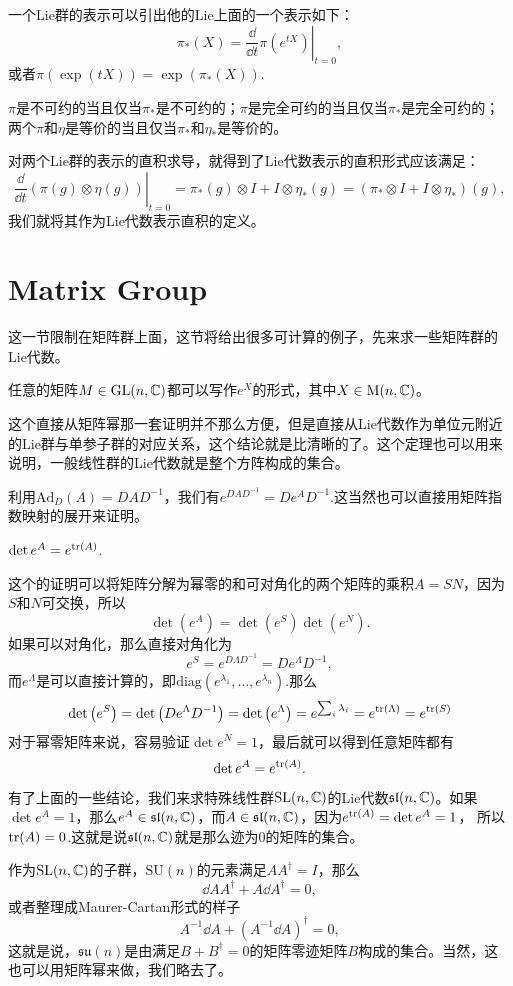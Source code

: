 一个Lie群的表示可以引出他的Lie上面的一个表示如下：
\[
	\pi_*(X)=\left.\frac{\dd}{\dd t}\pi(e^{tX})\right|_{t=0},
\]
或者$\pi(\exp(tX))=\exp(\pi_*(X))$.

\pro $\pi$是不可约的当且仅当$\pi_*$是不可约的；$\pi$是完全可约的当且仅当$\pi_*$是完全可约的；两个$\pi$和$\eta$是等价的当且仅当$\pi_*$和$\eta_*$是等价的。

对两个Lie群的表示的直积求导，就得到了Lie代数表示的直积形式应该满足：
\[
	\left.\frac{\dd}{\dd t}(\pi(g)\otimes \eta(g))\right|_{t=0}=\pi_*(g)\otimes I+I\otimes \eta_*(g)=(\pi_*\otimes I+I\otimes \eta_*)(g),
\]
我们就将其作为Lie代数表示直积的定义。

\section{Matrix Group}
这一节限制在矩阵群上面，这节将给出很多可计算的例子，先来求一些矩阵群的Lie代数。

\theo 任意的矩阵$M\in\mathrm{GL}(n,\mathbb{C})$都可以写作$e^X$的形式，其中$X\in\mathrm{M}(n,\mathbb{C})$。

这个直接从矩阵幂那一套证明并不那么方便，但是直接从Lie代数作为单位元附近的Lie群与单参子群的对应关系，这个结论就是比清晰的了。这个定理也可以用来说明，一般线性群的Lie代数就是整个方阵构成的集合。

\para 利用$\mathrm{Ad}_D(A)=DAD^{-1}$，我们有$e^{DAD^{-1}}=De^{A}D^{-1}$.这当然也可以直接用矩阵指数映射的展开来证明。

\pro $\det e^A=e^{\operatorname{tr}(A)}$.

这个的证明可以将矩阵分解为幂零的和可对角化的两个矩阵的乘积$A=SN$，因为$S$和$N$可交换，所以
\[
	\det \left(e^A\right)=\det\left(e^S\right)\det\left(e^N\right).
\]
如果可以对角化，那么直接对角化为
\[
	e^{S}=e^{D\Lambda D^{-1}}=De^{\Lambda} D^{-1},
\]
而$e^{\Lambda}$是可以直接计算的，即$\mathrm{diag}\left(e^{\lambda_1},\dots,e^{\lambda_n}\right)$.那么
\[
	\det \left(e^{S}\right)=\det \left(De^{\Lambda} D^{-1}\right)=\det \left(e^{\Lambda}\right)=e^{\sum_i \lambda_i}=e^{\operatorname{tr}(\Lambda)}=e^{\operatorname{tr}(S)}
\]
对于幂零矩阵来说，容易验证$\det e^N=1$，最后就可以得到任意矩阵都有
\[
	\det e^A=e^{\operatorname{tr}(A)}.
\]

有了上面的一些结论，我们来求特殊线性群$\mathrm{SL}(n,\mathbb{C})$的Lie代数$\mathfrak{sl}(n,\mathbb{C})$。如果$\det e^A=1$，那么$e^A\in \mathfrak{sl}(n,\mathbb{C})$，而$A \in \mathfrak{sl}(n,\mathbb{C})$，因为$e^{\operatorname{tr}(A)}=\det e^A=1$，
所以$\operatorname{tr}(A)=0$.这就是说$\mathfrak{sl}(n,\mathbb{C})$就是那么迹为0的矩阵的集合。

作为$\mathrm{SL}(n,\mathbb{C})$的子群，$\mathrm{SU}(n)$的元素满足$AA^\dag=I$，那么
\[
	\dd A A^\dag+A\dd A^\dag=0,
\]
或者整理成Maurer-Cartan形式的样子
\[
	A^{-1}\dd A +(A^{-1}\dd A)^\dag=0,
\]
这就是说，$\mathfrak{su}(n)$是由满足$B+B^\dag=0$的矩阵零迹矩阵$B$构成的集合。当然，这也可以用矩阵幂来做，我们略去了。

